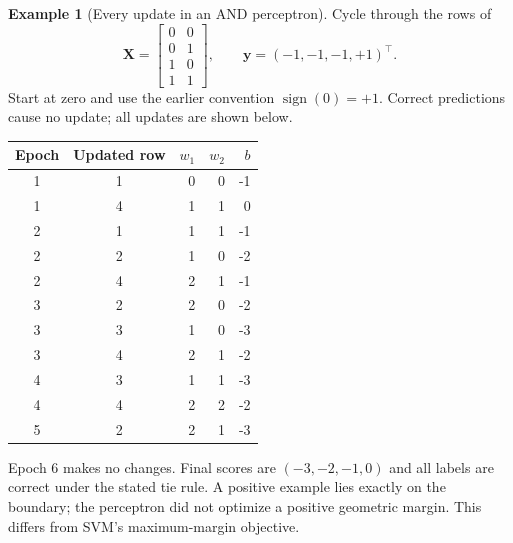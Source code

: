 \documentclass[11pt,twoside]{article}
\numberwithin{equation}{section}
\newcommand{\vect}[1]{\bm{#1}}
\newcommand{\mat}[1]{\bm{#1}}
\theoremstyle{plain}
\theoremstyle{definition}
\newtheorem{example}[theorem]{Example}
\theoremstyle{remark}
\begin{document}
\begin{example}[Every update in an AND perceptron]
Cycle through the rows of
\[
\mat X=\begin{bmatrix}0&0\\0&1\\1&0\\1&1\end{bmatrix},\qquad\vect y=(-1,-1,-1,+1)^\top.
\]
Start at zero and use the earlier convention $\operatorname{sign}(0)=+1$. Correct predictions cause no update; all updates are shown below.
\begin{center}
\begin{tabular}{cc|rrr}
Epoch & Updated row & $w_1$ & $w_2$ & $b$\\\hline
1&1&0&0&-1\\1&4&1&1&0\\
2&1&1&1&-1\\2&2&1&0&-2\\2&4&2&1&-1\\
3&2&2&0&-2\\3&3&1&0&-3\\3&4&2&1&-2\\
4&3&1&1&-3\\4&4&2&2&-2\\
5&2&2&1&-3
\end{tabular}
\end{center}
Epoch 6 makes no changes. Final scores are $(-3,-2,-1,0)$ and all labels are correct under the stated tie rule. A positive example lies exactly on the boundary; the perceptron did not optimize a positive geometric margin. This differs from SVM's maximum-margin objective.
\end{example}
\end{document}
